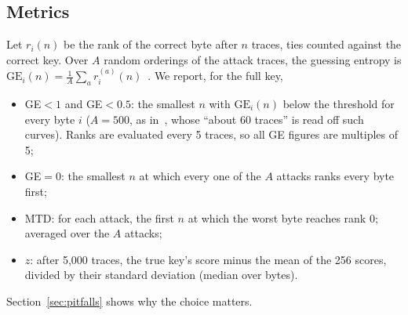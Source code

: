 \subsection{Metrics}
\label{sec:metrics}
Let $r_i(n)$ be the rank of the correct byte after $n$ traces, ties counted against the correct
key. Over $A$ random orderings of the attack traces, the guessing entropy is
$\mathrm{GE}_i(n)=\frac1A\sum_a r_i^{(a)}(n)$~\cite{SMY09}. We report, for the full key,
\begin{itemize}
  \item GE$<1$ and GE$<0.5$: the smallest $n$ with $\mathrm{GE}_i(n)$ below the threshold for every
    byte $i$ ($A=500$, as in~\cite{MS23}, whose ``about 60 traces'' is read off such curves). Ranks are
    evaluated every 5 traces, so all GE figures are multiples of 5;
  \item GE$=0$: the smallest $n$ at which every one of the $A$ attacks ranks every byte first;
  \item MTD: for each attack, the first $n$ at which the worst byte reaches rank 0; averaged over
    the $A$ attacks;
  \item $z$: after 5,000 traces, the true key's score minus the mean of the 256 scores, divided by
    their standard deviation (median over bytes).
\end{itemize}
Section~\ref{sec:pitfalls} shows why the choice matters.
